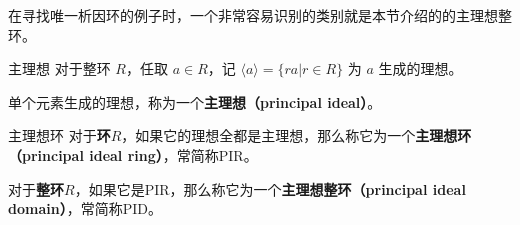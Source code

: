 

在寻找唯一析因环的例子时，一个非常容易识别的类别就是本节介绍的的主理想整环。

\begin{definition}{主理想}
对于整环 $R$，任取 $a\in R$，记 $\langle a \rangle=\{ra|r\in R\}$ 为 $a$ 生成的理想。

单个元素生成的理想，称为一个\textbf{主理想（principal ideal）}。
\end{definition}

\begin{definition}{主理想环}
对于\textbf{环}$R$，如果它的理想全都是主理想，那么称它为一个\textbf{主理想环（principal ideal ring）}，常简称PIR。

对于\textbf{整环}$R$，如果它是PIR，那么称它为一个\textbf{主理想整环（principal ideal domain）}，常简称PID。
\end{definition}







